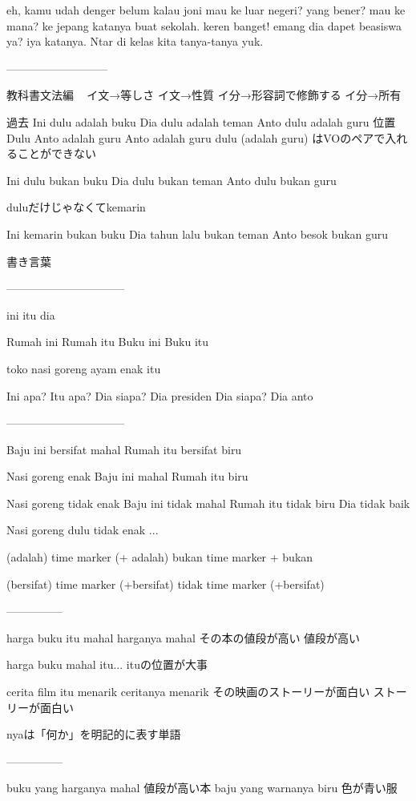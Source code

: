 \documentclass[uplatex]{jsarticle}
\begin{document}
eh, kamu udah denger belum kalau joni mau ke luar negeri?
yang bener? mau ke mana?
ke jepang katanya buat sekolah.
keren banget! emang dia dapet beasiswa ya?
iya katanya. Ntar di kelas kita tanya-tanya yuk.

---------------------------

教科書文法編
 
イ文→等しさ
イ文→性質
イ分→形容詞で修飾する
イ分→所有



過去
Ini dulu adalah buku
Dia dulu adalah teman
Anto dulu adalah guru
位置
Dulu Anto adalah guru
Anto adalah guru dulu
(adalah guru) はVOのペアで入れることができない

Ini dulu bukan buku
Dia dulu bukan teman
Anto dulu bukan guru

duluだけじゃなくてkemarin

Ini kemarin bukan buku
Dia tahun lalu bukan teman
Anto besok bukan guru

書き言葉

--------------------------------

ini itu
dia

Rumah ini
Rumah itu
Buku ini
Buku itu

toko nasi goreng ayam enak itu

Ini apa?
Itu apa?
Dia siapa?
Dia presiden
Dia siapa?
Dia anto

--------------------------------

Baju ini bersifat mahal
Rumah itu bersifat biru

Nasi goreng enak
Baju ini mahal
Rumah itu biru

Nasi goreng tidak enak
Baju ini tidak mahal
Rumah itu tidak biru
Dia tidak baik

Nasi goreng dulu tidak enak
...


(adalah) time marker (+ adalah)
bukan time marker + bukan

(bersifat) time marker (+bersifat)
tidak time marker (+bersifat)

---------------

harga buku itu mahal
harganya mahal
その本の値段が高い
値段が高い

harga buku mahal itu...
ituの位置が大事

cerita film itu menarik
ceritanya menarik
その映画のストーリーが面白い
ストーリーが面白い

nyaは「何か」を明記的に表す単語

---------------

buku yang harganya mahal
値段が高い本
baju yang warnanya biru
色が青い服
\end{document}
